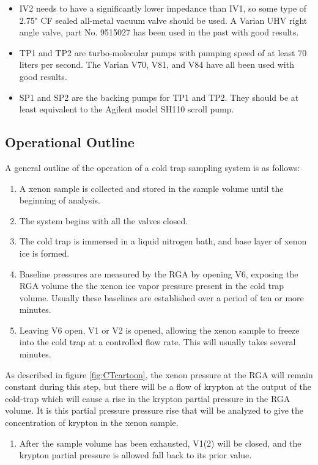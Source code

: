 \begin{itemize}
\item IV2 needs to have a significantly lower impedance than IV1, so some type of 2.75" CF sealed all-metal vacuum valve should be used. A Varian UHV right angle valve, part No. 9515027 has been used in the past with good results.
\item TP1 and TP2 are turbo-molecular pumps with pumping speed of at least 70 liters per second. The Varian V70, V81, and V84 have all been used with good results.
\item SP1 and SP2 are the backing pumps for TP1 and TP2. They should be at least equivalent to the Agilent model SH110 scroll pump.
\end{itemize}  

\subsection{Operational Outline}
\label{sec:outline}
A general outline of the operation of a cold trap sampling system is as follows:
\begin{enumerate}
\item A xenon sample is collected and stored in the sample volume until the beginning of analysis.
\item The system begins with all the valves closed.
\item  \label{step:analysis_start} The cold trap is immersed in a liquid nitrogen bath, and base layer of xenon ice is formed.
\item Baseline pressures are measured by the RGA by opening V6, exposing the RGA volume the the xenon ice vapor pressure present in the cold trap volume. Usually these baselines are established over a period of ten or more minutes.
\item \label{step:start_flow} Leaving V6 open, V1 or V2 is opened, allowing the xenon sample to freeze into the cold trap at a controlled flow rate. This will usually takes several minutes. 
\end{enumerate}
\noindent As described in figure \ref{fig:CTcartoon}, the xenon pressure at the RGA will remain constant during this step, but there will be a flow of krypton at the output of the cold-trap which will cause a rise in the krypton partial pressure in the RGA volume. It is this partial pressure pressure rise that will be analyzed to give the concentration of krypton in the xenon sample.
\begin{enumerate}[resume]
\item \label{step:stop_flow}After the sample volume has been exhausted, V1(2) will be closed, and the krypton partial pressure is allowed fall back to its prior value.
\end{enumerate}
